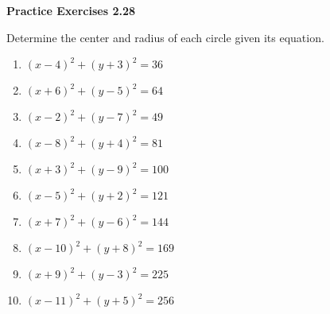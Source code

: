 \vspace{0.3ex}
\noindent\textbf{Practice Exercises 2.28}

\vspace{0.2ex}

Determine the center and radius of each circle given its equation.
\begin{multicols}{2}
\begin{enumerate}
    \item $(x - 4)^2 + (y + 3)^2 = 36$
    \item $(x + 6)^2 + (y - 5)^2 = 64$
    \item $(x - 2)^2 + (y - 7)^2 = 49$
    \item $(x - 8)^2 + (y + 4)^2 = 81$
    \item $(x + 3)^2 + (y - 9)^2 = 100$
    \item $(x - 5)^2 + (y + 2)^2 = 121$
    \item $(x + 7)^2 + (y - 6)^2 = 144$
    \item $(x - 10)^2 + (y + 8)^2 = 169$
    \item $(x + 9)^2 + (y - 3)^2 = 225$
    \item $(x - 11)^2 + (y + 5)^2 = 256$
\end{enumerate}
\end{multicols}
